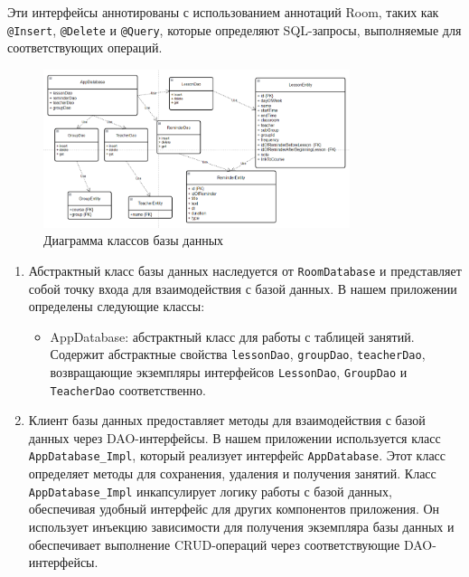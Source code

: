 \documentclass{vsureport}
\begin{document}
Эти интерфейсы аннотированы с использованием аннотаций Room, таких как \texttt{@Insert}, \texttt{@Delete} и \texttt{@Query}, которые определяют SQL-запросы, выполняемые для соответствующих операций. \cite{ref10}

\begin{figure}[H]
	\centering
	\includegraphics[width=0.8\textwidth]{9.png}
	\caption{Диаграмма классов базы данных}
	\label{fig:fig9}
\end{figure} 


\begin{enumerate}[start=3]
    \item Абстрактный класс базы данных наследуется от \texttt{RoomDatabase} и представляет собой точку входа для взаимодействия с базой данных. В нашем приложении определены следующие классы:
    
    \begin{itemize}
        \item AppDatabase: абстрактный класс для работы с таблицей занятий. Содержит абстрактные свойства \texttt{lessonDao}, \texttt{groupDao}, \texttt{teacherDao}, возвращающие экземпляры интерфейсов \texttt{LessonDao}, \texttt{GroupDao} и \texttt{TeacherDao} соответственно.
    \end{itemize}

    \item Клиент базы данных предоставляет методы для взаимодействия с базой данных через DAO-интерфейсы. В нашем приложении используется класс \texttt{AppDatabase\_Impl}, который реализует интерфейс \texttt{AppDatabase}. Этот класс определяет методы для сохранения, удаления и получения занятий. Класс \texttt{AppDatabase\_Impl} инкапсулирует логику работы с базой данных, обеспечивая удобный интерфейс для других компонентов приложения. Он использует инъекцию зависимости для получения экземпляра базы данных и обеспечивает выполнение CRUD-операций через соответствующие DAO-интерфейсы.
\end{enumerate}
\end{document}
